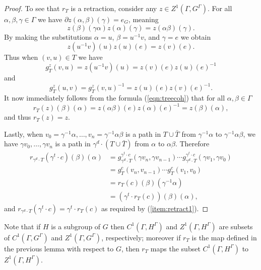 \documentclass[12pt]{amsart}
\theoremstyle{definition}
\begin{document}
\begin{proof}
	To see that $r_T$ is a retraction, consider any $z \in Z^1(\Gamma, G^\Gamma)$. For all $\alpha, \beta, \gamma \in \Gamma$ we have $\partial z(\alpha, \beta)(\gamma) = e_G$, meaning
	\[z(\beta)(\gamma \alpha) z(\alpha)(\gamma) = z(\alpha \beta)(\gamma).\]
	By making the substitutions $\alpha = u$, $\beta = u^{-1} v$, and $\gamma = e$ we obtain
	\[z(u^{-1} v)(u)  z(u)(e) = z(v)(e).\]
	Thus when $(v,u) \in T$ we have
	\[g_T^z(v,u) = z(u^{-1} v)(u) = z(v)(e) z(u)(e)^{-1}\]
	and
	\[g_T^z(u,v) = g_T^z(v,u)^{-1} = z(u)(e) z(v)(e)^{-1}.\]
	It now immediately follows from the formula (\ref{eqn:treecoh}) that for all $\alpha, \beta \in \Gamma$
	\[r_T(z)(\beta)(\alpha) = z(\alpha \beta)(e) z(\alpha)(e)^{-1} = z(\beta)(\alpha),\]
	and thus $r_T(z) = z$.
	
	Lastly, when $v_0 = \gamma^{-1} \alpha, \ldots, v_n = \gamma^{-1} \alpha \beta$ is a path in $T \cup \bar T$ from $\gamma^{-1} \alpha$ to $\gamma^{-1} \alpha \beta$, we have $\gamma v_0, \ldots, \gamma v_n$ is a path in $\gamma^d \cdot (T \cup \bar T)$ from $\alpha$ to $\alpha \beta$. Therefore
	\begin{align*}
		r_{\gamma^d \cdot T}(\gamma^t \cdot c)(\beta)(\alpha) & = g_{\gamma^d \cdot T}^{\gamma^t \cdot c}(\gamma v_n, \gamma v_{n-1}) \cdots g_{\gamma^d \cdot T}^{\gamma^t \cdot c}(\gamma v_1, \gamma v_0)\\
		& = g_T^c(v_n, v_{n-1}) \cdots g_T^c(v_1, v_0)\\
		& = r_T(c)(\beta)(\gamma^{-1} \alpha)\\
		& = (\gamma^t \cdot r_T(c))(\beta)(\alpha),
	\end{align*}
	and $r_{\gamma^d \cdot T}(\gamma^t \cdot c) = \gamma^t \cdot r_T(c)$ as required by (\ref{item:retract1}).
\end{proof}

Note that if $H$ is a subgroup of $G$ then $C^1(\Gamma, H^\Gamma)$ and $Z^1(\Gamma, H^\Gamma)$ are subsets of $C^1(\Gamma, G^\Gamma)$ and $Z^1(\Gamma, G^\Gamma)$, respectively; moreover if $r_T$ is the map defined in the previous lemma with respect to $G$, then $r_T$ maps the subset $C^1(\Gamma, H^\Gamma)$ to $Z^1(\Gamma, H^\Gamma)$.
\end{document}
